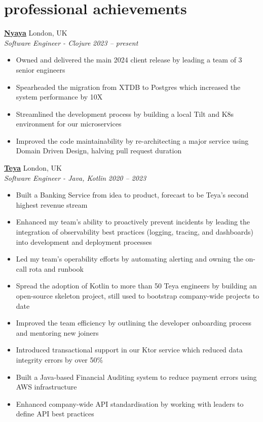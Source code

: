 \documentclass[12pt]{article}
\newcommand{\entry}[4]{{{\textbf{#1}}} \hfill #3 \\ #2 \hfill #4}
\begin{document}
    \section{professional achievements}

    \entry{\href{https://nyaya.tech}{Nyaya}}{\textit{Software Engineer - Clojure}}{London, UK}{\textit{2023 -- present}}
    \begin{itemize}[noitemsep,leftmargin=6mm,rightmargin=0mm,topsep=0pt]
        \item Owned and delivered the main 2024 client release by leading a team of 3 senior engineers
        \item Spearheaded the migration from XTDB to Postgres which increased the system performance by 10X
        \item Streamlined the development process by building a local Tilt and K8s environment for our microservices
        \item Improved the code maintainability by re-architecting a major service using Domain Driven Design, halving pull request duration
    \end{itemize}

    \smallskip
    \entry{\href{https://teya.com}{Teya}}{\textit{Software Engineer - Java, Kotlin}}{London, UK}{\textit{2020 -- 2023}}
    \begin{itemize}[noitemsep,leftmargin=6mm,rightmargin=0mm,topsep=0pt]
        \item Built a Banking Service from idea to product, forecast to be Teya's second highest revenue stream
        \item Enhanced my team's ability to proactively prevent incidents by leading the integration of observability best practices (logging, tracing, and dashboards) into development and deployment processes
        \item Led my team's operability efforts by automating alerting and owning the on-call rota and runbook
        \item Spread the adoption of Kotlin to more than 50 Teya engineers by building an open-source skeleton project, still used to bootstrap company-wide projects to date
        \item Improved the team efficiency by outlining the developer onboarding process and mentoring new joiners
        \item Introduced transactional support in our Ktor service which reduced data integrity errors by over 50\%
        \item Built a Java-based Financial Auditing system to reduce payment errors using AWS infrastructure
        \item Enhanced company-wide API standardisation by working with leaders to define API best practices
    \end{itemize}
\end{document}
